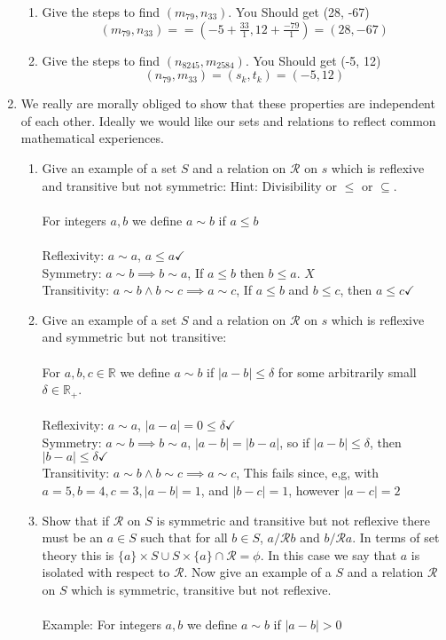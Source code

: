 \documentclass[11pt]{article}
\begin{document}
\begin{enumerate}
\begin{enumerate}
\item Give the steps to find $(m_{79}, n_{33})$.  You Should get (28, -67)
\\
$$(m_{79}, n_{33}) = = (-5 + \tfrac{33}{1}, 12 + \tfrac{-79}{1}) = (28, -67)$$
\item Give the steps to find $(n_{8245}, m_{2584})$.  You Should get (-5, 12)
\\
$$(n_{79}, m_{33}) = (s_k, t_k) = (-5, 12)$$
\end{enumerate}

\newpage %
\item We really are morally obliged to show that these properties are independent of each other. Ideally we would like our sets and relations to reflect common mathematical experiences.
\begin{enumerate}
\item Give an example of a set $S$ and a relation on $\mathcal{R}$ on $s$ which is reflexive and transitive but not symmetric: Hint: Divisibility or $\leq$ or $\subseteq$.
\\
\\
For integers $a, b$ we define $a \sim b$ if $a \leq b$\\
\\Reflexivity: $a \sim a$, $a \leq a \checkmark$
\\Symmetry: $a \sim b \implies b \sim a$, If $a \leq b$ then $b \leq a$. $X$ 
\\Transitivity: $a \sim b \wedge b \sim c \implies a \sim c$, If $a \leq b$ and $b \leq c$, then $a \leq c \checkmark$
\\
\item Give an example of a set $S$ and a relation on $\mathcal{R}$ on $s$ which is reflexive and symmetric but not transitive:\\
\\
For $a,b,c \in \mathbb{R}$ we define $a \sim b$ if $|a - b| \leq \delta$ for some arbitrarily small $\delta \in \mathbb{R}_+$.
\\
\\Reflexivity: $a \sim a$, $|a-a| = 0 \leq \delta \checkmark$
\\Symmetry: $a \sim b \implies b \sim a$, $|a-b| = |b-a|$, so if $|a-b| \leq \delta$, then $|b-a| \leq \delta  \checkmark$
\\Transitivity: $a \sim b \wedge b \sim c \implies a \sim c$, This fails since, e,g, with $a = 5, b = 4, c = 3, |a-b| = 1$, and $|b-c| = 1$, however $|a-c| = 2$
\item Show that if $\mathcal{R}$ on $S$ is symmetric and transitive but not reflexive there must be an $a \in S$ such that for all $b \in S$, $a /\mathcal{R} b$ and $b  /\mathcal{R} a$. In terms of set theory this is $\{a\} \times S \cup S \times \{a\} \cap \mathcal{R} = \phi$. In this case we say that $a$ is isolated with respect to $\mathcal{R}$. Now give an example of a $S$ and a relation $\mathcal{R}$ on $S$ which is symmetric, transitive but not reflexive.
\\
\\
Example: For integers $a,b$ we define $a \sim b$ if $|a-b| > 0$
\end{enumerate}


\end{enumerate}
\end{document}
